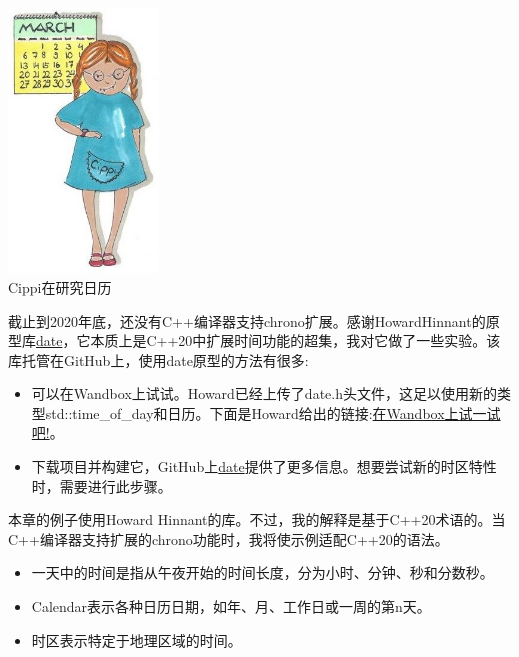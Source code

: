 \begin{center}
\includegraphics[width=0.3\textwidth]{content/3/chapter5/images/18.png}\\
Cippi在研究日历
\end{center}

\begin{tcolorbox}[breakable,enhanced jigsaw,colback=blue!5!white,colframe=blue!75!black,title={缺少编译器支持}]
	
截止到2020年底，还没有C++编译器支持chrono扩展。感谢HowardHinnant的原型库\href{https://github.com/HowardHinnant/date}{date}，它本质上是C++20中扩展时间功能的超集，我对它做了一些实验。该库托管在GitHub上，使用date原型的方法有很多:

\begin{itemize}
\item 
可以在Wandbox上试试。Howard已经上传了date.h头文件，这足以使用新的类型std::time\_of\_day和日历。下面是Howard给出的链接:\href{https://wandbox.org/permlink/L8MwjzSSC3fXXrMd}{在Wandbox上试一试吧!}。

\item 
下载项目并构建它，GitHub上\href{https://github.com/HowardHinnant/date}{date}提供了更多信息。想要尝试新的时区特性时，需要进行此步骤。
\end{itemize}

本章的例子使用Howard Hinnant的库。不过，我的解释是基于C++20术语的。当C++编译器支持扩展的chrono功能时，我将使示例适配C++20的语法。
\end{tcolorbox}

\begin{itemize}
\item 
一天中的时间是指从午夜开始的时间长度，分为小时、分钟、秒和分数秒。

\item 
Calendar表示各种日历日期，如年、月、工作日或一周的第n天。

\item 
时区表示特定于地理区域的时间。
\end{itemize}

